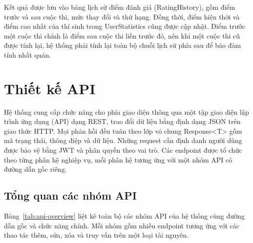 \documentclass[12pt, a4paper]{report}
\begin{document}
Kết quả được lưu vào bảng lịch sử điểm đánh giá (RatingHistory), gồm điểm trước và sau cuộc
thi, mức thay đổi và thứ hạng. Đồng thời, điểm hiện thời và điểm cao nhất của thí sinh trong
UserStatistics cũng được cập nhật. Điểm trước một cuộc thi chính là điểm sau cuộc thi liền
trước đó, nên khi một cuộc thi cũ được tính lại, hệ thống phải tính lại toàn bộ chuỗi lịch sử
phía sau để bảo đảm tính nhất quán.

\section{Thiết kế API}

Hệ thống cung cấp chức năng cho phía giao diện thông qua một tập giao diện lập trình ứng dụng
(\ac{API}) dạng \ac{REST}, trao đổi dữ liệu bằng định dạng \ac{JSON} trên giao thức \ac{HTTP}.
Mọi phản hồi đều tuân theo lớp vỏ chung Response<T> gồm mã trạng thái, thông điệp và dữ liệu.
Những request cần định danh người dùng được bảo vệ bằng \ac{JWT} và phân quyền theo vai trò.
Các endpoint được tổ chức theo từng phân hệ nghiệp vụ, mỗi phân hệ tương ứng với một nhóm
\ac{API} có đường dẫn gốc riêng.

\subsection{Tổng quan các nhóm API}

Bảng~\ref{tab:api-overview} liệt kê toàn bộ các nhóm \ac{API} của hệ thống cùng đường dẫn gốc
và chức năng chính. Mỗi nhóm gồm nhiều endpoint tương ứng với các thao tác thêm, sửa, xóa và
truy vấn trên một loại tài nguyên.
\end{document}
